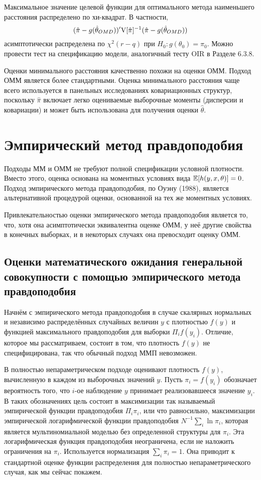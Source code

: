 Максимальное значение целевой функции для оптимального метода наименьшего расстояния распределено по хи-квадрат. В частности,
\begin{equation}
(\hat{\pi}-g(\hat{\theta}_{OMD}))' \mathrm{V}[\hat{\pi}]^{-1}(\hat{\pi}-g(\hat{\theta}_{OMD})) 
\end{equation}
асимптотически распределена по $\chi^2(r-q)$ при $H_0:g(\theta_0)=\pi_0$. Можно провести тест на спецификацию модели, аналогичный тесту OIR в Разделе 6.3.8.

Оценки минимального расстояния качественно похожи на оценки ОММ. Подход ОММ является более стандартными. Оценка минимального расстояния чаще всего используется в панельных исследованиях ковариационных структур, поскольку $\hat{\pi}$ включает легко оцениваемые выборочные моменты (дисперсии и ковариации) и может быть использована для получения оценки $\hat{\theta}$.

\section{Эмпирический метод правдоподобия}

Подходы ММ и ОММ не требуют полной спецификации условной плотности. Вместо этого, оценка основана на моментных условиях вида $\mathbb{E}[h(y,x,\theta)]=0$. Подход эмпирического метода правдоподобия, по Оуэну (1988), является альтернативной процедурой оценки, основанной на тех же моментных условиях.

Привлекательностью оценки эмпирического метода правдоподобия является то, что, хотя она асимптотически эквивалентна оценке ОММ, у неё другие свойства в конечных выборках, и в некоторых случаях она превосходит оценку ОММ.

\subsection{Оценки математического ожидания генеральной совокупности с помощью эмпирического метода правдоподобия}

Начнём с эмпирического метода правдоподобия в случае скалярных нормальных и независимо распределённых случайных величин $y$ с плотностью $f(y)$ и функцией максимального правдоподобия для выборки $\Pi_i f(y_i)$. Отличие, которое мы рассматриваем, состоит в том, что плотность $f(y)$ не специфицирована, так что обычный подход ММП невозможен.

В полностью непараметрическом подходе оценивают плотность $f(y)$, вычисленную в каждом из выборочных значений $y$. Пусть $\pi_i=f(y_i)$ обозначает вероятность того, что $i$-ое наблюдение $y$ принимает реализовавшееся значение $y_i$. В таких обозначениях цель состоит в максимизации так называемый эмпирической функции правдоподобия $\Pi_i \pi_i$, или что равносильно, максимизации эмпирической логарифмической функции правдоподобия $N^{-1} \sum_i \ln \pi_i$, которая является мультиномиальной моделью без определенной структуры для $\pi_i$. Эта логарифмическая функция правдоподобия неограничена, если не наложить  ограничения на $\pi_i$. Используется нормализация $\sum_i \pi_i=1$. Она приводит к стандартной оценке функции распределения для полностью непараметрического случая, как мы сейчас покажем.


